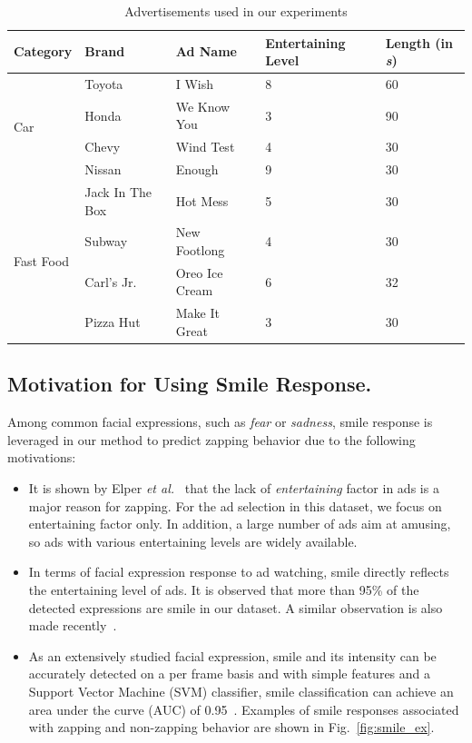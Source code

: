 \documentclass[twoside,leqno,twocolumn]{article}
\begin{document}
\begin{table}[!t]
\caption{Advertisements used in our experiments} \label{table:ads}
\centering
\scriptsize
\begin{tabular}{lllll}
\toprule
Category & Brand & Ad Name & Entertaining Level & Length (in \textit{s}) \\ \midrule

\multirow{4}{*}{Car}        & Toyota & I Wish  & 8 & 60			\\ %
                            & Honda  & We Know You  & 3 & 90 \\ %
                            & Chevy  & Wind Test  & 4 & 30  \\ %
                            & Nissan & Enough   & 9 & 30    \\ %
\midrule 
\multirow{4}{*}{Fast Food} & Jack In The Box & Hot Mess               & 5 &  30 \\ %
                            & Subway                & New Footlong    & 4 & 30 \\ %
                            & Carl's Jr.            & Oreo Ice Cream  & 6 &  32 \\ %
                            & Pizza Hut             & Make It Great   & 3 & 30 \\ %
\bottomrule
\end{tabular}
\end{table} 

\subsection{Motivation for Using Smile Response.}
Among common facial expressions, such as \textit{fear} or \textit{sadness}, smile response is leveraged in our method to predict zapping behavior due to the following motivations:
\begin{itemize}
\item It is shown by Elper \textit{et al.}~\cite{Elpers03} that the lack of \textit{entertaining} factor in ads is a major reason for zapping. For the ad selection in this dataset, we focus on entertaining factor only. In addition, a large number of ads aim at amusing, so ads with various entertaining levels are widely available. 

\item In terms of facial expression response to ad watching, smile directly reflects the entertaining level of ads. It is observed that more than 95\% of the detected expressions are smile in our dataset. A similar observation is also made recently~\cite{amfed}. 

\item As an extensively studied facial expression, smile and its intensity can be accurately detected on a per frame basis and with simple features and a Support Vector Machine (SVM) classifier, smile classification can achieve an area under the curve (AUC) of 0.95~\cite{Yang_TAC14}. Examples of smile responses associated with zapping and non-zapping behavior are shown in Fig.~\ref{fig:smile_ex}. 


\end{itemize}
\end{document}
